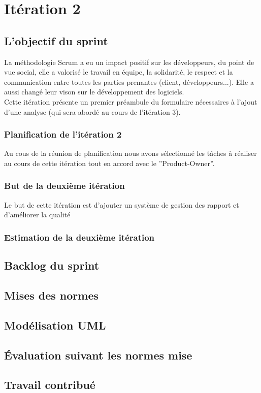 \section{Itération 2}

\subsection{L'objectif du sprint}
La méthodologie Scrum a eu un impact positif sur les développeurs, du point de vue social, elle
a valorisé le travail en équipe, la solidarité, le respect et la communication entre toutes les
parties prenantes (client, développeurs...). Elle a aussi changé leur vison sur le développement
des logiciels.\\
Cette itération présente un premier préambule du formulaire nécessaires à l’ajout
d’une analyse (qui sera abordé au cours de l’itération 3).
  \subsubsection{Planification de l'itération 2}
  Au cous de la réunion de planification nous avons sélectionné les tâches à réaliser au
  cours de cette itération tout en accord avec le ”Product-Owner”.
  \subsubsection{But de la deuxième itération}
  Le but de cette itération est d'ajouter un système de gestion des rapport et d'améliorer
  la qualité
  \subsubsection{Estimation de la deuxième itération}
  
\subsection{Backlog du sprint}
\subsection{Mises des normes}
\subsection{Modélisation UML}
\subsection{Évaluation suivant les normes mise}
\subsection{Travail contribué}